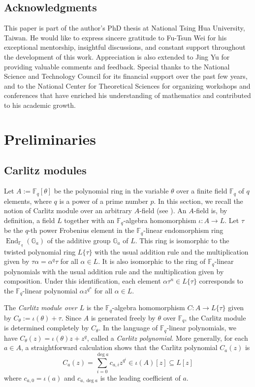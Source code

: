\documentclass[11pt]{amsart}
\theoremstyle{plain}
\theoremstyle{definition}
\theoremstyle{remark}
\numberwithin{equation}{section}
\newcommand{\FF}{\mathbb{F}}
\newcommand{\GG}{\mathbb{G}}
\newcommand{\End}{\operatorname{End}}
\newcommand{\sbe}{\subseteq}
\newcommand{\Fq}{\FF_q}
\newcommand{\T}{\theta}
\begin{document}
	\subsection*{Acknowledgments}
	
	This paper is part of the author's PhD thesis at National Tsing Hua University, Taiwan.
	He would like to express sincere gratitude to Fu-Tsun Wei for his exceptional mentorship, insightful discussions, and constant support throughout the development of this work.
	Appreciation is also extended to Jing Yu for providing valuable comments and feedback.
	Special thanks to the National Science and Technology Council for its financial support over the past few years, and to the National Center for Theoretical Sciences for organizing workshops and conferences that have enriched his understanding of mathematics and contributed to his academic growth.
	
	\section{Preliminaries}
	
	\subsection{Carlitz modules}    \label{section-carlitz-module}
	
	Let $A := \Fq[\T]$ be the polynomial ring in the variable $\T$ over a finite field $\Fq$ of $q$ elements, where $q$ is a power of a prime number $p$.
	In this section, we recall the notion of Carlitz module over an arbitrary $A$-field (see \cite[Chapter 3]{goss1996basic}).
	An $A$-field is, by definition, a field $L$ together with an $\Fq$-algebra homomorphism $\iota: A \to L$.
	Let $\tau$ be the $q$-th power Frobenius element in the $\Fq$-linear endomorphism ring $\End_{\Fq}(\GG_a)$ of the additive group $\GG_a$ of $L$.
	This ring is isomorphic to the twisted polynomial ring $L\{\tau\}$ with the usual addition rule and the multiplication given by $\tau \alpha = \alpha^q \tau$ for all $\alpha \in L$.
	It is also isomorphic to the ring of $\Fq$-linear polynomials with the usual addition rule and the multiplication given by composition.
	Under this identification, each element $\alpha\tau^n \in L\{\tau\}$ corresponds to the $\Fq$-linear polynomial $\alpha z^{q^n}$ for all $\alpha\in L$.
	
	The \textit{Carlitz module over $L$} is the $\Fq$-algebra homomorphism $C: A \to L\{\tau\}$ given by $C_\T := \iota(\T) + \tau$. 
	Since $A$ is generated freely by $\T$ over $\Fq$, the Carlitz module is determined completely by $C_\T$.
	In the language of $\Fq$-linear polynomials, we have $C_\T(z) = \iota(\T)z + z^q$, called a \textit{Carlitz polynomial}.
	More generally, for each $a \in A$, a straightforward calculation shows that the Carlitz polynomial $C_a(z)$ is
	\begin{equation}    \label{carlitz-polynomial}
		C_a(z) = \sum_{i=0}^{\deg a} c_{a,i} z^{q^i} \in \iota(A)[z] \sbe L[z]
	\end{equation}
	where $c_{a,0} = \iota(a)$ and $c_{a,\deg a}$ is the leading coefficient of $a$.
	
\end{document}

